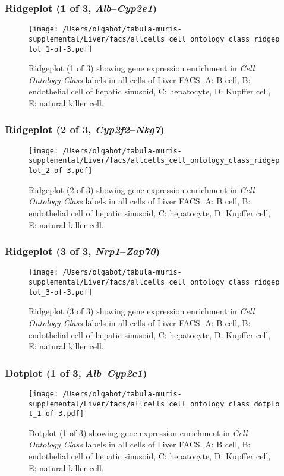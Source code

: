 \subsubsection{Ridgeplot (1 of 3, \emph{Alb}--\emph{Cyp2e1})}
\begin{figure}[h]
\centering
\texttt{[image: /Users/olgabot/tabula-muris-supplemental/Liver/facs/allcells\_cell\_ontology\_class\_ridgeplot\_1-of-3.pdf]}

\caption{ Ridgeplot (1 of 3)  showing gene expression enrichment in \emph{Cell Ontology Class} labels in all cells of Liver FACS. A: B cell, B: endothelial cell of hepatic sinusoid, C: hepatocyte, D: Kupffer cell, E: natural killer cell.}
\end{figure}


\clearpage

\subsubsection{Ridgeplot (2 of 3, \emph{Cyp2f2}--\emph{Nkg7})}
\begin{figure}[h]
\centering
\texttt{[image: /Users/olgabot/tabula-muris-supplemental/Liver/facs/allcells\_cell\_ontology\_class\_ridgeplot\_2-of-3.pdf]}

\caption{ Ridgeplot (2 of 3)  showing gene expression enrichment in \emph{Cell Ontology Class} labels in all cells of Liver FACS. A: B cell, B: endothelial cell of hepatic sinusoid, C: hepatocyte, D: Kupffer cell, E: natural killer cell.}
\end{figure}


\clearpage

\subsubsection{Ridgeplot (3 of 3, \emph{Nrp1}--\emph{Zap70})}
\begin{figure}[h]
\centering
\texttt{[image: /Users/olgabot/tabula-muris-supplemental/Liver/facs/allcells\_cell\_ontology\_class\_ridgeplot\_3-of-3.pdf]}

\caption{ Ridgeplot (3 of 3)  showing gene expression enrichment in \emph{Cell Ontology Class} labels in all cells of Liver FACS. A: B cell, B: endothelial cell of hepatic sinusoid, C: hepatocyte, D: Kupffer cell, E: natural killer cell.}
\end{figure}


\clearpage

\subsubsection{Dotplot (1 of 3, \emph{Alb}--\emph{Cyp2e1})}
\begin{figure}[h]
\centering
\texttt{[image: /Users/olgabot/tabula-muris-supplemental/Liver/facs/allcells\_cell\_ontology\_class\_dotplot\_1-of-3.pdf]}

\caption{ Dotplot (1 of 3)  showing gene expression enrichment in \emph{Cell Ontology Class} labels in all cells of Liver FACS. A: B cell, B: endothelial cell of hepatic sinusoid, C: hepatocyte, D: Kupffer cell, E: natural killer cell.}
\end{figure}


